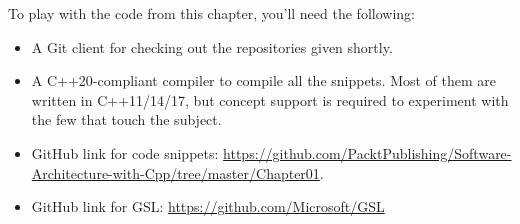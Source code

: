 To play with the code from this chapter, you'll need the following:

\begin{itemize}
\item 
A Git client for checking out the repositories given shortly.

\item 
A C++20-compliant compiler to compile all the snippets. Most of them are written in C++11/14/17, but concept support is required to experiment with the few that touch the subject.


\item 
GitHub link for code snippets: \url{https://github.com/PacktPublishing/Software-Architecture-with-Cpp/tree/master/Chapter01}.


\item 
GitHub link for GSL: \url{https://github.com/Microsoft/GSL}

\end{itemize}